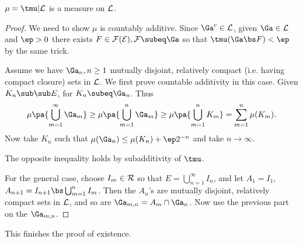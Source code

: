 \begin{thm}\label{mumeas}
$\mu=\tmu|\cal L$ is a measure on $\cal L$.
\end{thm}
\begin{proof}
We need to show $\mu$ is countably additive. Since $\Ga^c\in \cal L$, given $\Ga\in \cal L$ and $\ep>0$ there exists $F\in \cal F(E),F\subeq \Ga$ so that $\tmu(\Ga\bs F)<\ep$ by the same trick.%

Assume we have $\Ga_n,n\geq 1$ mutually disjoint, relatively compact (i.e. having compact closure) sets in $\cal L$. We first prove countable additivity in this case. Given $K_n\sub\sub E$, for $K_n\subeq \Ga_n$. %
Thus
\[
\mu\pa{\bigcup_{m=1}^{\infty}\Ga_m}\geq
\mu\pa{\bigcup_{m=1}^{n}\Ga_m}\geq
\mu\pa{\bigcup_{m=1}^n K_m}
=\sum_{m=1}^n \mu(K_m).
\]
Now take $K_n$ such that $\mu(\Ga_n)\leq \mu(K_n)+\ep2^{-n}$ and take $n\to \infty$.

The opposite inequality holds by subadditivity of $\tmu$.

For the general case, choose $I_m\in \cal R$ so that $E=\bigcup_{n=1}^{\infty} I_n$, and let $A_1=I_1$, $A_{n+1}=I_{n+1}\bs \bigcup_{m=1}^n I_m$. Then the $A_n$'s are mutually disjoint, relatively compact sets in $\cal L$, and so are $\Ga_{m,n}=A_m\cap \Ga_n$. Now use the previous part on the $\Ga_{m,n}$.
\end{proof}
This finishes the proof of existence.